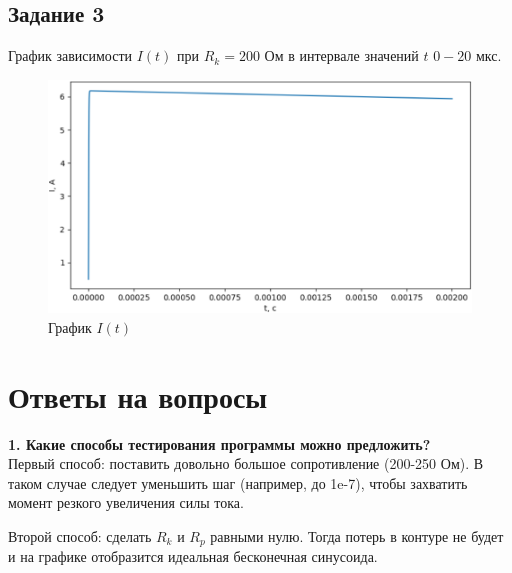 \subsection*{Задание 3}
График зависимости $I(t)$ при $R_k = 200$ Ом в интервале значений $t$ $0-20$ мкс.
\begin{figure}[h!]
	\includegraphics[scale=0.6]{img/8.png}
	\caption{График $I(t)$}
\end{figure}

\section*{Ответы на вопросы}

\textbf{1. Какие способы тестирования программы можно предложить?}\\

Первый способ: поставить довольно большое сопротивление (200-250 Ом). В таком случае следует уменьшить шаг (например, до 1e-7), чтобы захватить момент резкого увеличения силы тока.

Второй способ: сделать $R_k$ и $R_p$ равными нулю. Тогда потерь в контуре не будет и на графике отобразится идеальная бесконечная синусоида.

